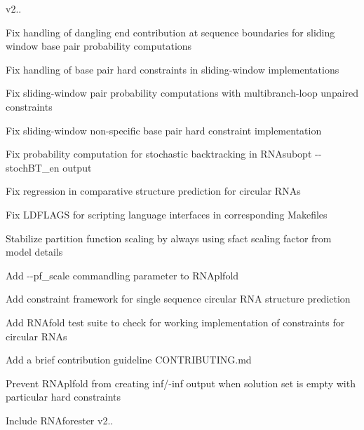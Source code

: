 v2..
\begin{DoxyItemize}
\item Fix handling of dangling end contribution at sequence boundaries for sliding window base pair probability computations
\item Fix handling of base pair hard constraints in sliding-\/window implementations
\item Fix sliding-\/window pair probability computations with multibranch-\/loop unpaired constraints
\item Fix sliding-\/window non-\/specific base pair hard constraint implementation
\item Fix probability computation for stochastic backtracking in R\+N\+Asubopt -\/-\/stoch\+B\+T\+\_\+en output
\item Fix regression in comparative structure prediction for circular R\+N\+As
\item Fix L\+D\+F\+L\+A\+GS for scripting language interfaces in corresponding Makefiles
\item Stabilize partition function scaling by always using sfact scaling factor from model details
\item Add -\/-\/pf\+\_\+scale commandling parameter to R\+N\+Aplfold
\item Add constraint framework for single sequence circular R\+NA structure prediction
\item Add R\+N\+Afold test suite to check for working implementation of constraints for circular R\+N\+As
\item Add a brief contribution guideline C\+O\+N\+T\+R\+I\+B\+U\+T\+I\+N\+G.\+md
\item Prevent R\+N\+Aplfold from creating inf/-\/inf output when solution set is empty with particular hard constraints
\item Include R\+N\+Aforester v2..
\end{DoxyItemize}

